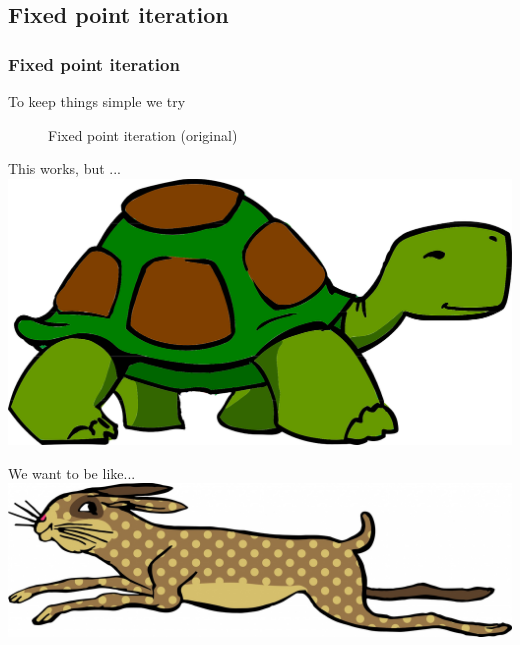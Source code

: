 \subsection{Fixed point iteration}
\begin{frame}
	\frametitle{Fixed point iteration}
	To keep things simple we try

	\begin{figure}
	\begin{algorithm}[H]
	\caption{Fixed point iteration (original)}
	
	\BlankLine
	\end{algorithm}
	\end{figure}
\end{frame}


\begin{frame}
	\begin{block}{This works, but ...} \vspace{1cm}
		\includegraphics[scale=0.25]{../Figures/turtle}	
	\end{block}
\end{frame}
\begin{frame}
	\begin{block}{We want to be like...} \vspace{2cm}
		\includegraphics[scale=0.17]{../Figures/hare}
	\end{block}
\end{frame}

